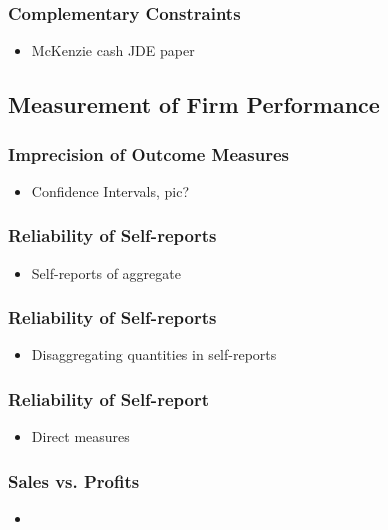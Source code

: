 \documentclass[hideothersubsections, usenames,dvipsnames,10pt]{beamer}
\begin{document}
\begin{frame}
\frametitle{Complementary Constraints}
	\begin{itemize}
	\item McKenzie cash JDE paper
	\vspace{0.1in}
	\end{itemize}
\end{frame}


\subsection{Measurement of Firm Performance}

\begin{frame}
\frametitle{Imprecision of Outcome Measures}
	\begin{itemize}
	\item Confidence Intervals, pic?
	\vspace{0.1in}
	\end{itemize}
\end{frame}

\begin{frame}
\frametitle{Reliability of Self-reports}
	\begin{itemize}
	\item Self-reports of aggregate
	\vspace{0.1in}
	\end{itemize}
\end{frame}

\begin{frame}
\frametitle{Reliability of Self-reports}
	\begin{itemize}
	\item Disaggregating quantities in self-reports
	\vspace{0.1in}
	\end{itemize}
\end{frame}

\begin{frame}
\frametitle{Reliability of Self-report}
	\begin{itemize}
	\item Direct measures
	\vspace{0.1in}
	\end{itemize}
\end{frame}


\begin{frame}
\frametitle{Sales vs. Profits}
	\begin{itemize}
	\item 
	\vspace{0.1in}
	\end{itemize}
\end{frame}
\end{document}
